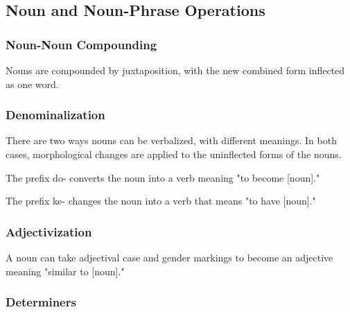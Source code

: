 \subsection{Noun and Noun-Phrase Operations}

\subsubsection{Noun-Noun Compounding}
Nouns are compounded by juxtaposition, with the new combined form inflected as one word.

\subsubsection{Denominalization}
There are two ways nouns can be verbalized, with different meanings. In both cases, morphological changes are applied to the uninflected forms of the nouns.

The prefix \textlangle do\textrangle - converts the noun into a verb meaning "to become [noun]."

The prefix \textlangle ke\textrangle - changes the noun into a verb that means "to have [noun]."

\subsubsection{Adjectivization}
A noun can take adjectival case and gender markings to become an adjective meaning "similar to [noun]."

\subsubsection{Determiners}

